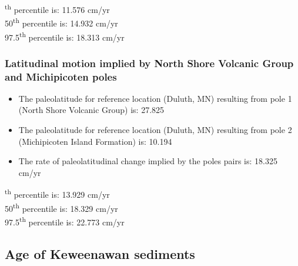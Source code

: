 \documentclass{article}
\begin{document}
\textsuperscript{th} percentile is: 11.576 cm/yr\\
50\textsuperscript{th} percentile is: 14.932 cm/yr\\
97.5\textsuperscript{th} percentile is: 18.313 cm/yr\\
    
\newpage

\subsubsection{Latitudinal motion implied by North Shore Volcanic Group and Michipicoten poles}\label{MamainseMichipicotenRate}

\begin{itemize}
\item{The paleolatitude for reference location (Duluth, MN) resulting from pole 1 (North Shore Volcanic Group) is: 27.825\textdegree}
\item{The paleolatitude for reference location (Duluth, MN) resulting from pole 2 (Michipicoten Island Formation) is: 10.194\textdegree}
\item{The rate of paleolatitudinal change implied by the poles pairs is: 18.325 cm/yr}
\end{itemize}

    \begin{center}
    \end{center}
    
    \begin{figure}[h]
    \centering
    \end{figure}
    
\textsuperscript{th} percentile is: 13.929 cm/yr\\
50\textsuperscript{th} percentile is: 18.329 cm/yr\\
97.5\textsuperscript{th} percentile is: 22.773 cm/yr\\

\newpage


    
    \subsection{Age of Keweenawan
sediments}\label{age-of-keweenawan-sediments}
\end{document}
